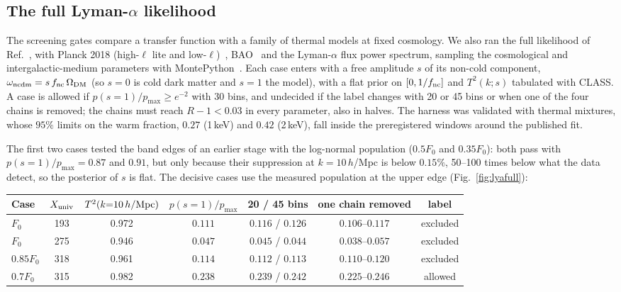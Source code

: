 \documentclass[11pt,a4paper]{article}
\newcommand{\Xu}{X_{\rm univ}}
\begin{document}
\subsection{The full Lyman-\texorpdfstring{$\alpha$}{alpha} likelihood}
\label{sec:lyafull}

The screening gates compare a transfer function with a family of thermal models at fixed cosmology.
We also ran the full likelihood of Ref.~\cite{Hooper2022}, with Planck 2018 (high-$\ell$ lite and low-$\ell$)~\cite{Planck2018V}, BAO~\cite{Alam2017} and the Lyman-$\alpha$ flux power spectrum, sampling the cosmological and intergalactic-medium parameters with MontePython~\cite{MontePython2019}.
Each case enters with a free amplitude $s$ of its non-cold component, $\omega_{\rm ncdm}=s\,f_{\rm nc}\,\Omega_{\rm DM}$ (so $s=0$ is cold dark matter and $s=1$ the model), with a flat prior on $[0,1/f_{\rm nc}]$ and $T^2(k;s)$ tabulated with CLASS.
A case is allowed if $p(s=1)/p_{\max}\ge e^{-2}$ with 30 bins, and undecided if the label changes with 20 or 45 bins or when one of the four chains is removed; the chains must reach $R-1<0.03$ in every parameter, also in halves.
The harness was validated with thermal mixtures, whose $95\%$ limits on the warm fraction, $0.27$ (1\,keV) and $0.42$ (2\,keV), fall inside the preregistered windows around the published fit.

The first two cases tested the band edges of an earlier stage with the log-normal population ($0.5F_0$ and $0.35F_0$): both pass with $p(s=1)/p_{\max}=0.87$ and $0.91$, but only because their suppression at $k=10\,h$/Mpc is below $0.15\%$, 50--100 times below what the data detect, so the posterior of $s$ is flat.
The decisive cases use the measured population at the upper edge (Fig.~\ref{fig:lyafull}):

\begin{table}[h]
\centering\small
\begin{tabular}{lcccccc}
\toprule
Case & $\Xu$ & $T^2(k{=}10\,h/{\rm Mpc})$ & $p(s{=}1)/p_{\max}$ & 20 / 45 bins & one chain removed & label\\
\midrule
$F_0$ & 193 & 0.972 & $0.111$ & $0.116$ / $0.126$ & $0.106$--$0.117$ & excluded\\
$F_0$ & 275 & 0.946 & $0.047$ & $0.045$ / $0.044$ & $0.038$--$0.057$ & excluded\\
$0.85F_0$ & 318 & 0.961 & $0.114$ & $0.112$ / $0.113$ & $0.110$--$0.120$ & excluded\\
$0.7F_0$ & 315 & 0.982 & $0.238$ & $0.239$ / $0.242$ & $0.225$--$0.246$ & allowed\\
\bottomrule
\end{tabular}
\end{table}
\end{document}
